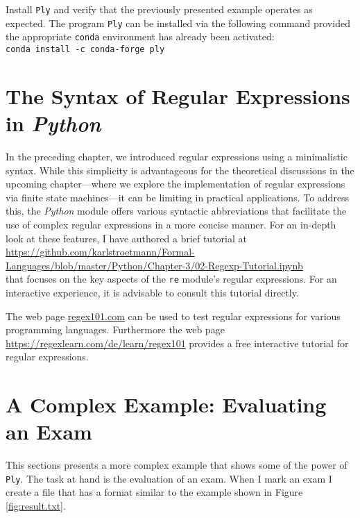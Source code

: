 \homeworkEng
Install \texttt{Ply} and verify that the previously presented example operates as expected.
The program \texttt{Ply} can be installed via the following command provided the appropriate \texttt{conda}
environment has already been activated:
\\[0.2cm]
\hspace*{1.3cm}
\texttt{conda install -c conda-forge ply}

\section{The Syntax of Regular Expressions in \textsl{Python}}
In the preceding chapter, we introduced regular expressions using a minimalistic syntax. While this simplicity
is advantageous for the theoretical discussions in the upcoming chapter---where we explore the implementation of
regular expressions via finite state machines---it can be limiting in practical applications. To address this,
the \textsl{Python} module  offers various syntactic abbreviations that facilitate the
use of complex regular expressions in a more concise manner. For an in-depth look at these features, I
have authored a brief tutorial at 
\\[0.2cm]
\hspace*{-1.3cm}
\href{https://github.com/karlstroetmann/Formal-Languages/blob/master/Python/Chapter-03/02-Regexp-Tutorial.ipynb}{https://github.com/karlstroetmann/Formal-Languages/blob/master/Python/Chapter-3/02-Regexp-Tutorial.ipynb}
\\[0.2cm]
that focuses on the key aspects of the \texttt{re} module's regular expressions. For an interactive experience,
it is advisable to consult this tutorial directly. 

The web page \href{https://regex101.com}{regex101.com} can be used to test regular expressions for
various programming languages.  Furthermore the web page
\href{https://regexlearn.com/de/learn/regex101}{https://regexlearn.com/de/learn/regex101} provides a free
interactive tutorial for regular expressions.

\section{A Complex Example: Evaluating an Exam}
This sections presents a more complex example that shows some of the power of \texttt{Ply}.  The
task at hand is the evaluation of an exam.  When I mark an exam I create a file that has a format
similar to the example shown in Figure \ref{fig:result.txt}. 

